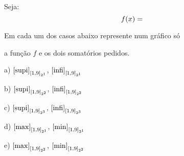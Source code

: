 \documentclass[oneside,12pt]{article}
\begin{document}
Seja:
%
$$f(x) = \EC
$$

\msk

Em cada um dos casos abaixo represente num gráfico só

a função $f$ e os dois somatórios pedidos.

\msk

a) $\text{[supi]}_{[1,9]_{2^1}}$, $\text{[infi]}_{[1,9]_{2^1}}$

b) $\text{[supi]}_{[1,9]_{2^2}}$, $\text{[infi]}_{[1,9]_{2^2}}$

c) $\text{[supi]}_{[1,9]_{2^3}}$, $\text{[infi]}_{[1,9]_{2^3}}$

d) $\text{[max]}_{[1,9]_{2^1}}$, $\text{[min]}_{[1,9]_{2^1}}$

e) $\text{[max]}_{[1,9]_{2^2}}$, $\text{[min]}_{[1,9]_{2^2}}$


\newpage


\def\EB{\scalebox{1.0}{$\ga{Exercicio 8 bare}$}}
\def\EC{\scalebox{1.0}{$\ga{Exercicio 8}$}}


\vspace*{-0.25cm}
\hspace*{-0.5cm}
$\scalebox{0.5}{$
 \begin{array}{ccccccc}
 \EC && \EB && \EB && \EB \\[60pt]
 \EB && \EB && \EB && \EB \\[60pt]
 \EB && \EB && \EB && \EB \\[60pt]
 \EB && \EB && \EB && \EB \\[60pt]
 \end{array}
 $}
$




\end{document}
